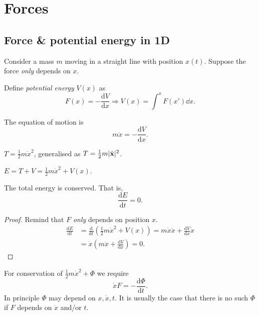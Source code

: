 \section{Forces}
\subsection{Force \& potential energy in 1D}

Consider a mass $m$ moving in a straight line with position $x(t)$. Suppose the force \textit{only} depends on $x$.
\begin{definition}
    Define \textit{potential energy} $ V(x) $ as 
    \[
        F(x) = -\frac{\mathrm{d}V}{\mathrm{d}x} \Longrightarrow V(x) = \int^{x}F(x')\dd x.
    \]
\end{definition}

The equation of motion is
\[
    m \ddot{x}=-\frac{\mathrm{d}V}{\mathrm{d}x} .
\]

\begin{definition}
    $T=\frac{1}{2}m \dot{x}^2$, generalised as $ T=\frac{1}{2}m|\dot{{\bf x}}|^2 $. 
\end{definition}
\begin{definition}
    $ E=T+V = \frac{1}{2}m \dot{x}^2+V(x) $.
\end{definition}
\begin{proposition}
    The total energy is conserved. That is, 
    \[
        \frac{\mathrm{d}E}{\mathrm{d}t}=0. 
    \]
\end{proposition}
\begin{proof}
    Remind that $F$ \textit{only} depends on position $x$.
    \begin{align*}
        \frac{\mathrm{d}E}{\mathrm{d}t} &= \frac{\mathrm{d}}{\mathrm{d}t}\left( \frac{1}{2} m \dot{x}^2+V(x) \right) = m \dot{x} \ddot{x} + \frac{\mathrm{d}V}{\mathrm{d}x} \dot{x}\\
        &= \dot{x} \left( m \ddot{x} + \frac{\mathrm{d}V}{\mathrm{d}x}  \right) = 0.
    \end{align*}
\end{proof}

\begin{note}
    For conservation of $ \frac{1}{2} m \dot{x}^2 + \Phi $ we require 
    \[
        \dot{x}F = -\frac{\mathrm{d}\Phi}{\mathrm{d}t}. 
    \]
    In principle $ \Phi $ may depend on $ x, \dot{x}, t $. It is usually the case that there is no such $ \Phi $ if $F$ depends on $ \dot{x} $ and/or $t$.
\end{note}

